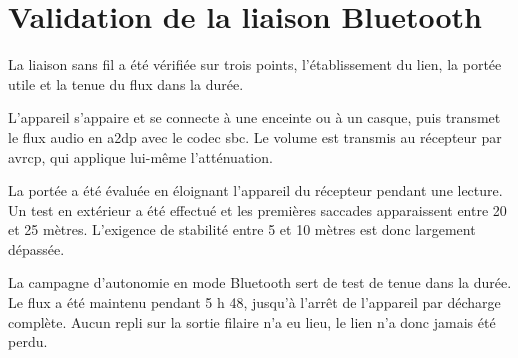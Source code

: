 \section{Validation de la liaison Bluetooth}
\label{sec:res_bluetooth}

La liaison sans fil a été vérifiée sur trois points, l'établissement du lien, la portée utile et la tenue du flux dans la durée.

L'appareil s'appaire et se connecte à une enceinte ou à un casque, puis transmet le flux audio en \gls{a2dp} avec le codec \gls{sbc}. Le volume est transmis au récepteur par \gls{avrcp}, qui applique lui-même l'atténuation.

La portée a été évaluée en éloignant l'appareil du récepteur pendant une lecture. Un test en extérieur a été effectué et les premières saccades apparaissent entre 20 et 25 mètres. L'exigence de stabilité entre 5 et 10 mètres est donc largement dépassée.

La campagne d'autonomie en mode Bluetooth sert de test de tenue dans la durée. Le flux a été maintenu pendant 5 h 48, jusqu'à l'arrêt de l'appareil par décharge complète. Aucun repli sur la sortie filaire n'a eu lieu, le lien n'a donc jamais été perdu.
